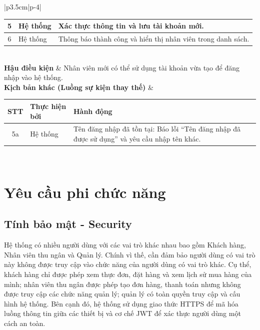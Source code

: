 \documentclass[../20232006p.tex]{subfiles}
\begin{document}
\begin{center}
\begin{longtable}{|p{3.5cm}|p{\dimexpr\textwidth-3.5cm-4\tabcolsep\relax}|}
\begin{tabular}{|c|p{2cm}|p{6.5cm}|}
            \hline
            5            & Hệ thống               & Xác thực thông tin và lưu tài khoản mới.                                                          \\
            \hline
            6            & Hệ thống               & Thông báo thành công và hiển thị nhân viên trong danh sách.                                       \\
            \hline
        \end{tabular}
        \vspace{0.5em}                                                                                                              \\
        \hline
        \textbf{Hậu điều kiện}                          & Nhân viên mới có thể sử dụng tài khoản vừa tạo để đăng nhập vào hệ thống. \\
        \hline
        \textbf{Kịch bản khác (Luồng sự kiện thay thế)} &
        \vspace{0.5em}
        \begin{tabular}{|c|p{2cm}|p{6.5cm}|}
            \hline
            \textbf{STT} & \textbf{Thực hiện bởi} & \textbf{Hành động}                                                                            \\
            \hline
            5a           & Hệ thống               & Tên đăng nhập đã tồn tại: Báo lỗi ``Tên đăng nhập đã được sử dụng'' và yêu cầu nhập tên khác. \\
            \hline
        \end{tabular}
        \vspace{0.5em}                                                                                                              \\
        \hline
        \caption{Đặc tả chức năng Thêm nhân viên}
        \label{tab:uc_add_employee}
    \end{longtable}
\end{center}
\hfill

\section{Yêu cầu phi chức năng}
\label{section:2.4}
\subsection{Tính bảo mật - Security}
Hệ thống có nhiều người dùng với các vai trò khác nhau bao gồm Khách hàng, Nhân viên thu ngân và Quản lý. Chính vì thế, cần đảm bảo người dùng có vai trò này không được truy cập vào chức năng của người dùng có vai trò khác. Cụ thể, khách hàng chỉ được phép xem thực đơn, đặt hàng và xem lịch sử mua hàng của mình; nhân viên thu ngân được phép tạo đơn hàng, thanh toán nhưng không được truy cập các chức năng quản lý; quản lý có toàn quyền truy cập và cấu hình hệ thống. Bên cạnh đó, hệ thống sử dụng giao thức HTTPS để mã hóa luồng thông tin giữa các thiết bị và cơ chế JWT để xác thực người dùng một cách an toàn.
\end{document}
